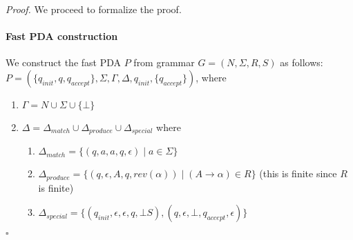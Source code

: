 \documentclass[a4paper]{article}
\newenvironment{proof}{\begin{breakbox}\textit{Proof.}}{\hfill$\square$\end{breakbox}}
\newcommand{\nl}{\vspace{0.2cm}\\}
\begin{document}
\begin{proof}
    We proceed to formalize the proof.

    \paragraph{Fast PDA construction}
    We construct the fast PDA $P$ from grammar $G = (N, \Sigma, R, S)$ as follows:\nl
    $P = (\{q_{init}, q, q_{accept}\}, \Sigma, \Gamma, \Delta, q_{init}, \{q_{accept}\})$, where
    \begin{enumerate}
        \item $\Gamma = N \cup \Sigma \cup \{\bot\}$
        \item $\Delta = \Delta_{match} \cup \Delta_{produce} \cup \Delta_{special}$ where
            \begin{enumerate}
                \item $\Delta_{match} = \{(q, a, a, q, \epsilon) \mid a \in \Sigma\}$
                \item $\Delta_{produce} = \{(q, \epsilon, A, q, rev(\alpha)) \mid (A \to \alpha) \in R\}$ (this is finite since $R$ is finite)
                \item $\Delta_{special} = \{(q_{init}, \epsilon, \epsilon, q, \bot S), (q, \epsilon, \bot, q_{accept}, \epsilon)\}$
            \end{enumerate}
    \end{enumerate}


\end{proof}
\end{document}
